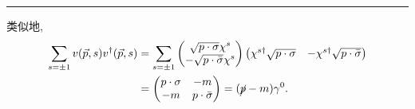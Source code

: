 \begin{itemize}
\begin{tcolorbox}[title=calculation:]
		\noindent\rule[0.5ex]{\linewidth}{0.5pt} %
		
		类似地,
		\begin{align}
			\sum_{s = \pm 1} v(\vec{p}, s) v^\dag(\vec{p}, s) &= \sum_{s = \pm 1} \begin{pmatrix}
				\sqrt{p \cdot \sigma} \chi^s \\
				- \sqrt{p \cdot \bar{\sigma}} \chi^s
			\end{pmatrix} \begin{pmatrix}
				\chi^{s \dag} \sqrt{p \cdot \sigma} & - \chi^{s \dag} \sqrt{p \cdot \bar{\sigma}}
			\end{pmatrix} \notag \\
			&= \begin{pmatrix}
				p \cdot \sigma & - m \\
				- m & p \cdot \bar{\sigma}
			\end{pmatrix} = (\cancel{p} - m) \gamma^0.
		\end{align}
	\end{tcolorbox}
\end{itemize}

